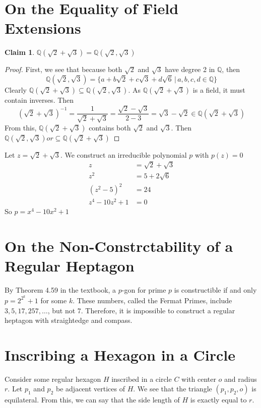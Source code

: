 \documentclass[12pt]{article}
\newtheorem*{claim*}{Claim}
\newcommand*{\Q}{\mathbb{Q}}
\newcommand*{\inv}{^{-1}}
\begin{document}
\section{On the Equality of Field Extensions}
\begin{claim*}
$\Q(\sqrt{2} + \sqrt{3}) = \Q(\sqrt{2}, \sqrt{3})$
\end{claim*}
\begin{proof}
First, we see that because both $\sqrt{2}$ and $\sqrt{3}$ have degree 2 in $\Q$, then
\[\Q(\sqrt{2}, \sqrt{3}) = \{a + b\sqrt{2} + c\sqrt{3} + d\sqrt{6} \, | \, a,b,c,d \in \Q\}\]
Clearly $\Q(\sqrt{2} + \sqrt{3}) \subseteq \Q(\sqrt{2}, \sqrt{3})$. As $\Q(\sqrt{2} + \sqrt{3})$ is a field, it must contain inverses. Then
\[(\sqrt{2} + \sqrt{3})\inv = \frac{1}{\sqrt{2} + \sqrt{3}} = \frac{\sqrt{2} - \sqrt{3}}{2 - 3} = \sqrt{3} - \sqrt{2} \in \Q(\sqrt{2} + \sqrt{3})\]
From this, $\Q(\sqrt{2} + \sqrt{3})$ contains both $\sqrt{2}$ and $\sqrt{3}$. Then $\Q(\sqrt{2}, \sqrt{3}) or \subseteq \Q(\sqrt{2} + \sqrt{3})$
\end{proof}
\noindent Let $z = \sqrt{2} + \sqrt{3}$. We construct an irreducible polynomial $p$ with $p(z) = 0$
\begin{align*}
z &= \sqrt{2} + \sqrt{3}\\
z^2 &= 5 + 2 \sqrt{6}\\
(z^2 - 5)^2 &= 24\\
z^4 - 10z^2 + 1 &= 0
\end{align*}
So $p = x^4 - 10x^2 + 1$

\section{On the Non-Constrctability of a Regular Heptagon}
By Theorem 4.59 in the textbook, a $p$-gon for prime $p$ is constructible if and only $p = 2 ^ {2 ^ k} + 1$ for some $k$. These numbers, called the Fermat Primes, include $3, 5, 17, 257, \ldots$, but not $7$. Therefore, it is impossible to construct a regular heptagon with straightedge and compass.


\section{Inscribing a Hexagon in a Circle}
Consider some regular hexagon $H$ inscribed in a circle $C$ with center $o$ and radius $r$. Let $p_1$ and $p_2$ be adjacent vertices of $H$. We see that the triangle $(p_1,p_2,o)$ is equilateral. From this, we can say that the side length of $H$ is exactly equal to $r$.
\end{document}

